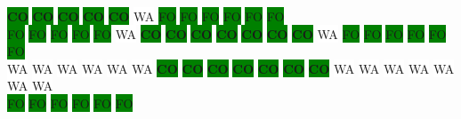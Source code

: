 \colorbox{green}{\color[rgb]{0,0,0}\textbf{CO}}%
\colorbox{green}{\color[rgb]{0,0,0}\textbf{CO}}%
\colorbox{green}{\color[rgb]{0,0,0}\textbf{CO}}%
\colorbox{green}{\color[rgb]{0,0,0}\textbf{CO}}%
\colorbox{green}{\color[rgb]{0,0,0}\textbf{CO}}%
\colorbox{white}{\color[gray]{0.5}WA}%
\colorbox{green}{\color[gray]{0.75}FO}%
\colorbox{green}{\color[gray]{0.75}FO}%
\colorbox{green}{\color[gray]{0.75}FO}%
\colorbox{green}{\color[gray]{0.75}FO}%
\colorbox{green}{\color[gray]{0.75}FO}%
\colorbox{green}{\color[gray]{0.75}FO}%
\\
\colorbox{green}{\color[gray]{0.75}FO}%
\colorbox{green}{\color[gray]{0.75}FO}%
\colorbox{green}{\color[gray]{0.75}FO}%
\colorbox{green}{\color[gray]{0.75}FO}%
\colorbox{green}{\color[gray]{0.75}FO}%
\colorbox{white}{\color[gray]{0.5}WA}%
\colorbox{green}{\color[rgb]{0,0,0}\textbf{CO}}%
\colorbox{green}{\color[rgb]{0,0,0}\textbf{CO}}%
\colorbox{green}{\color[rgb]{0,0,0}\textbf{CO}}%
\colorbox{green}{\color[rgb]{0,0,0}\textbf{CO}}%
\colorbox{green}{\color[rgb]{0,0,0}\textbf{CO}}%
\colorbox{green}{\color[rgb]{0,0,0}\textbf{CO}}%
\colorbox{green}{\color[rgb]{0,0,0}\textbf{CO}}%
\colorbox{white}{\color[gray]{0.5}WA}%
\colorbox{green}{\color[gray]{0.75}FO}%
\colorbox{green}{\color[gray]{0.75}FO}%
\colorbox{green}{\color[gray]{0.75}FO}%
\colorbox{green}{\color[gray]{0.75}FO}%
\colorbox{green}{\color[gray]{0.75}FO}%
\colorbox{green}{\color[gray]{0.75}FO}%
\\
\colorbox{white}{\color[gray]{0.5}WA}%
\colorbox{white}{\color[gray]{0.5}WA}%
\colorbox{white}{\color[gray]{0.5}WA}%
\colorbox{white}{\color[gray]{0.5}WA}%
\colorbox{white}{\color[gray]{0.5}WA}%
\colorbox{white}{\color[gray]{0.5}WA}%
\colorbox{green}{\color[rgb]{0,0,0}\textbf{CO}}%
\colorbox{green}{\color[rgb]{0,0,0}\textbf{CO}}%
\colorbox{green}{\color[rgb]{0,0,0}\textbf{CO}}%
\colorbox{green}{\color[rgb]{0,0,0}\textbf{CO}}%
\colorbox{green}{\color[rgb]{0,0,0}\textbf{CO}}%
\colorbox{green}{\color[rgb]{0,0,0}\textbf{CO}}%
\colorbox{green}{\color[rgb]{0,0,0}\textbf{CO}}%
\colorbox{white}{\color[gray]{0.5}WA}%
\colorbox{white}{\color[gray]{0.5}WA}%
\colorbox{white}{\color[gray]{0.5}WA}%
\colorbox{white}{\color[gray]{0.5}WA}%
\colorbox{white}{\color[gray]{0.5}WA}%
\colorbox{white}{\color[gray]{0.5}WA}%
\colorbox{white}{\color[gray]{0.5}WA}%
\\
\colorbox{green}{\color[gray]{0.75}FO}%
\colorbox{green}{\color[gray]{0.75}FO}%
\colorbox{green}{\color[gray]{0.75}FO}%
\colorbox{green}{\color[gray]{0.75}FO}%
\colorbox{green}{\color[gray]{0.75}FO}%
\colorbox{green}{\color[gray]{0.75}FO}%
